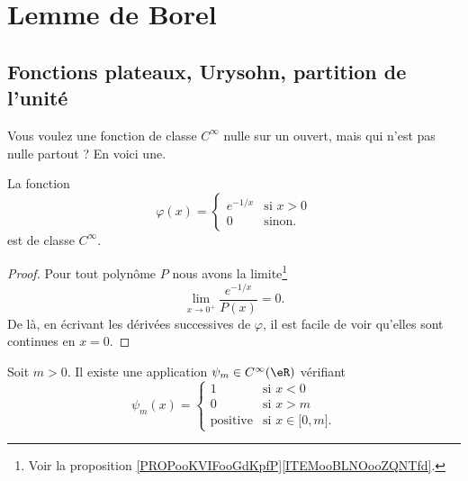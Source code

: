\section{Lemme de Borel}

\subsection{Fonctions plateaux, Urysohn, partition de l'unité}
\label{subsecOSYAooXXCVjv}


Vous voulez une fonction de classe \( C^{\infty}\) nulle sur un ouvert, mais qui n'est pas nulle partout ? En voici une.
\begin{lemma}       \label{LEMooFLUSooKaZRRY}
	La fonction
	\begin{equation}
		\varphi(x)=\begin{cases}
			e^{-1/x} & \text{si } x>0 \\
			0        & \text{sinon}.
		\end{cases}
	\end{equation}
	est de classe \(  C^{\infty}\).
\end{lemma}

\begin{proof}
	Pour tout polynôme \( P\) nous avons la limite\footnote{Voir la proposition \ref{PROPooKVIFooGdKpfP}\ref{ITEMooBLNOooZQNTfd}.}
	\begin{equation}
		\lim_{x\to 0^+} \frac{ e^{-1/x} }{ P(x)} =0 .
	\end{equation}
	De là, en écrivant les dérivées successives de \( \varphi\), il est facile de voir qu'elles sont continues en \( x=0\).
\end{proof}


\begin{lemma}       \label{LEMooRVSIooKcpWoK}
	Soit \( m>0\). Il existe une application \( \psi_m\in  C^{\infty}(\eR)\) vérifiant
	\begin{equation}
		\psi_m(x)=\begin{cases}
			1               & \text{si } x<0                               \\
			0               & \text{si } x>m                               \\
			\text{positive} & \text{si } x\in\mathopen[ 0 , m \mathclose].
		\end{cases}
	\end{equation}
\end{lemma}


